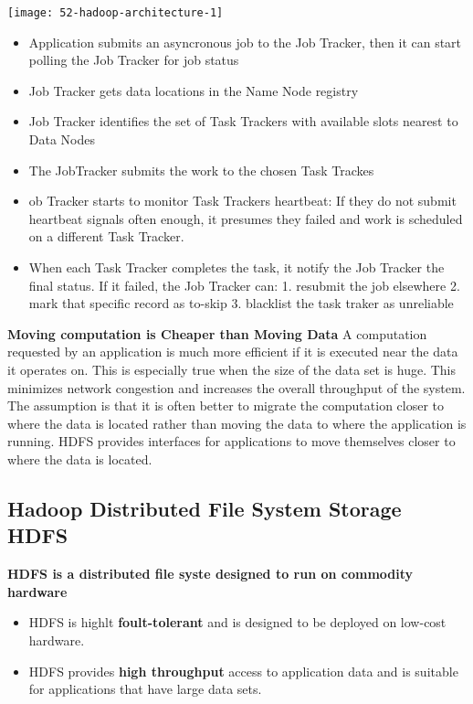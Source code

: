 \begin{center}
\texttt{[image: 52-hadoop-architecture-1]}
\end{center}

\begin{itemize}
	\item Application submits an asyncronous job to the Job Tracker, then it can start polling the Job Tracker for job status
	\item Job Tracker gets data locations in the Name Node registry
	\item Job Tracker identifies the set of Task Trackers with available slots nearest to Data Nodes
	\item The JobTracker submits the work to the chosen Task Trackes
	\item ob Tracker starts to monitor Task Trackers heartbeat: If they do not submit heartbeat signals often enough, it presumes they failed and work is scheduled on a different Task Tracker.
	\item When each Task Tracker completes the task, it notify the Job Tracker the final status. If it failed, the Job Tracker can:
	1. resubmit the job elsewhere
	2. mark that specific record as to-skip
	3. blacklist the task traker as unreliable
\end{itemize}

\textbf{Moving computation is Cheaper than Moving Data}
A computation requested by an application is much more efficient if it is executed near the data it operates on. This is especially true when the size of the data set is huge. This minimizes network congestion and increases the overall throughput of the system. The assumption is that it is often better to migrate the computation closer to where the data is located rather than moving the data to where the application is running. HDFS provides interfaces for applications to move themselves closer to where the data is located.

\subsection{Hadoop Distributed File System Storage HDFS}

\textbf{HDFS is a distributed file syste designed to run on commodity hardware}

\begin{itemize}
	\item HDFS is highlt \textbf{foult-tolerant} and is designed to be deployed on low-cost hardware.
	\item HDFS provides \textbf{high throughput} access to application data and is suitable for applications that have large data sets.
\end{itemize}

